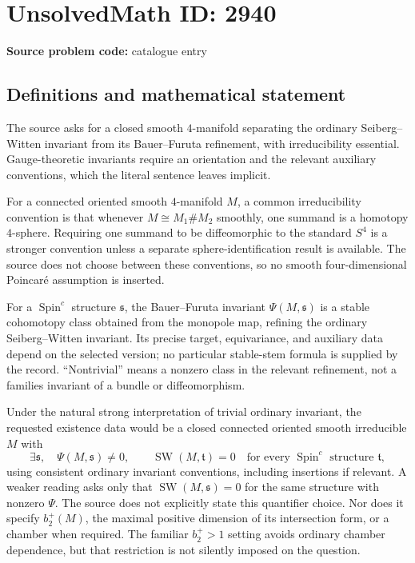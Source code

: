 \documentclass[11pt]{article}
\begin{document}
\section*{UnsolvedMath ID: 2940}
\textbf{Source problem code:} catalogue entry
\subsection{Definitions and mathematical statement}
The source asks for a closed smooth $4$-manifold separating the ordinary Seiberg--Witten invariant from its Bauer--Furuta refinement, with irreducibility essential. Gauge-theoretic invariants require an orientation and the relevant auxiliary conventions, which the literal sentence leaves implicit.

For a connected oriented smooth $4$-manifold $M$, a common irreducibility convention is that whenever $M\cong M_1\#M_2$ smoothly, one summand is a homotopy $4$-sphere. Requiring one summand to be diffeomorphic to the standard $S^4$ is a stronger convention unless a separate sphere-identification result is available. The source does not choose between these conventions, so no smooth four-dimensional Poincaré assumption is inserted.

For a $\operatorname{Spin}^c$ structure $\mathfrak s$, the Bauer--Furuta invariant $\Psi(M,\mathfrak s)$ is a stable cohomotopy class obtained from the monopole map, refining the ordinary Seiberg--Witten invariant. Its precise target, equivariance, and auxiliary data depend on the selected version; no particular stable-stem formula is supplied by the record. ``Nontrivial'' means a nonzero class in the relevant refinement, not a families invariant of a bundle or diffeomorphism.

Under the natural strong interpretation of trivial ordinary invariant, the requested existence data would be a closed connected oriented smooth irreducible $M$ with
\[
\exists\mathfrak s,\quad\Psi(M,\mathfrak s)\ne0,
\qquad
\operatorname{SW}(M,\mathfrak t)=0\quad\text{for every }\operatorname{Spin}^c\text{ structure }\mathfrak t,
\]
using consistent ordinary invariant conventions, including insertions if relevant. A weaker reading asks only that $\operatorname{SW}(M,\mathfrak s)=0$ for the same structure with nonzero $\Psi$. The source does not explicitly state this quantifier choice. Nor does it specify $b_2^+(M)$, the maximal positive dimension of its intersection form, or a chamber when required. The familiar $b_2^+>1$ setting avoids ordinary chamber dependence, but that restriction is not silently imposed on the question.
\end{document}

